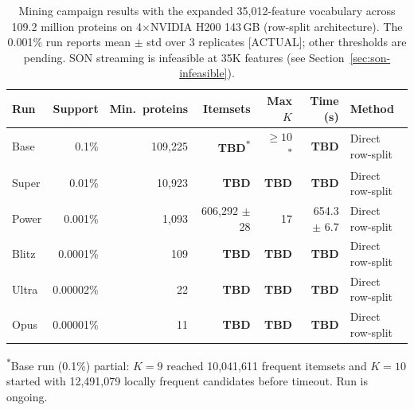 %


%

\begin{table}[t]
\caption{Mining campaign results with the expanded 35,012-feature vocabulary
across 109.2 million proteins on 4$\times$NVIDIA H200 143\,GB (row-split
architecture). The 0.001\% run reports mean $\pm$ std over 3 replicates
[ACTUAL]; other thresholds are pending. SON streaming is infeasible at
35K features (see Section~\ref{sec:son-infeasible}).}
\label{tab:campaign-35k}
\centering
\small
\begin{tabular}{lrrr@{\hskip 6pt}r@{\hskip 6pt}rl}
\toprule
Run & Support & Min.\ proteins
    & Itemsets
    & Max $K$
    & Time (s)
    & Method \\
\midrule
Base   & 0.1\%      & 109,225 & \textbf{TBD}\textsuperscript{$\ast$} & ${\geq}10$\textsuperscript{$\ast$} & \textbf{TBD} & Direct row-split \\
Super  & 0.01\%     & 10,923  & \textbf{TBD} & \textbf{TBD} & \textbf{TBD} & Direct row-split \\
Power  & 0.001\%    & 1,093   & 606,292 $\pm$ 28 & 17 & 654.3 $\pm$ 6.7 & Direct row-split \\
Blitz  & 0.0001\%   & 109     & \textbf{TBD} & \textbf{TBD} & \textbf{TBD} & Direct row-split \\
Ultra  & 0.00002\%  & 22      & \textbf{TBD} & \textbf{TBD} & \textbf{TBD} & Direct row-split \\
Opus   & 0.00001\%  & 11      & \textbf{TBD} & \textbf{TBD} & \textbf{TBD} & Direct row-split \\
\bottomrule
\end{tabular}

\smallskip
\noindent\textsuperscript{$\ast$}\footnotesize Base run (0.1\%) partial:
$K{=}9$ reached 10,041,611 frequent itemsets and $K{=}10$ started with
12,491,079 locally frequent candidates before timeout. Run is ongoing.
\end{table}


